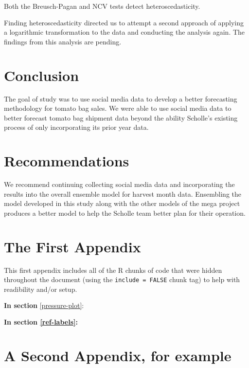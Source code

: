 \documentclass[12pt,oneside]{chicagocapstone}
\begin{document}
Both the Breusch-Pagan and NCV tests detect heteroscedasticity.

Finding heteroscedasticity directed us to attempt a second approach of
applying a logarithmic transformation to the data and conducting the
analysis again. The findings from this analysis are pending.

\chapter*{Conclusion}\label{conclusion}

The goal of study was to use social media data to develop a better
forecasting methodology for tomato bag sales. We were able to use social
media data to better forecast tomato bag shipment data beyond the
ability Scholle's existing process of only incorporating its prior year
data.

\chapter*{Recommendations}\label{recommendations}

We recommend continuing collecting social media data and incorporating
the results into the overall ensemble model for harvest month data.
Ensembling the model developed in this study along with the other models
of the mega project produces a better model to help the Scholle team
better plan for their operation.

\appendix

\chapter{The First Appendix}\label{the-first-appendix}

This first appendix includes all of the R chunks of code that were
hidden throughout the document (using the \texttt{include\ =\ FALSE}
chunk tag) to help with readibility and/or setup.

\textbf{In section} \ref{pressure-plot}:

\textbf{In section \ref{ref-labels}:}

\chapter{A Second Appendix, for
example}\label{a-second-appendix-for-example}

\backmatter
\end{document}
